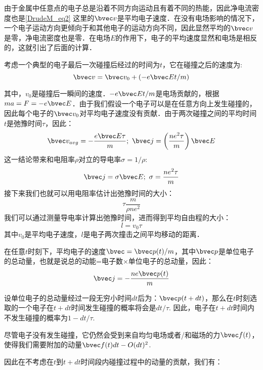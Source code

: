 由于金属中任意点的电子总是沿着不同方向运动且有着不同的热能，因此净电流密度也是\autoref{DrudeM_eq2} 这里的$\bvec v$是平均电子速度．在没有电场影响的情况下，一个电子运动方向更倾向于和其他电子的运动方向不同，因此显然平均的$\bvec v$是零，净电流密度也是零．在电场$E$的作用下，电子的平均速度显然和电场是相反的，这就引出了后面的计算．

考虑一个典型的电子最后一次碰撞后经过的时间为$t$，它在碰撞之后的速度为:
\begin{equation}
\bvec v = \bvec v_0 + (-e\bvec E t/m)
\end{equation}

其中，$v_0$是碰撞后一瞬间的速度．$-e\bvec E t/m$是电场贡献的，根据$ma = F = -e\bvec E$．由于我们假设一个电子可以是在任意方向上发生碰撞的，因此每个电子的$\bvec v_0$对平均电子速度没有贡献．由于两次碰撞之间的平均时间$t$是弛豫时间$\tau$，因此：
\begin{equation}
\bvec v_{avg} = -\frac{e\bvec E \tau}{m}; \ \bvec j =\left(\frac{ne^2\tau}{m}\right)\bvec E
\end{equation}
这一结论带来和电阻率$\rho$对立的导电率$\sigma = 1/\rho$:
\begin{equation}\label{DrudeM_eq4}
\bvec j = \sigma \bvec E; \ \sigma = \frac{ne^2\tau}{m}
\end{equation}
接下来我们也就可以用电阻率估计出弛豫时间的大小：
\begin{equation}
\tau \frac{m}{\rho n e^2}
\end{equation}
我们可以通过测量导电率计算出弛豫时间，进而得到平均自由程的大小：
\begin{equation}
l=v_0\tau
\end{equation}
其中$v_0$是平均电子速度，$l$是电子两次撞击之间平均移动的距离．

在任意$t$时刻下，平均电子的速度$\bvec=\bvec p(t)/m$，其中$\bvec p$是单位电子的总动量，也就是说总的动能=电子数$\times$单位电子的总动量，因此：
\begin{equation}
\bvec j= -\frac{ne\bvec p(t)}{m}
\end{equation}

设单位电子的总动量经过一段无穷小时间$dt$后为：$\bvec p (t+dt)$，那么在$t$时刻选取的一个电子在$t+dt$时间发生碰撞的概率将会是$dt/\tau$. 因此，电子在$t+dt$时间内不发生碰撞的概率为$1-dt/\tau$.

尽管电子没有发生碰撞，它仍然会受到来自均匀电场或者/和磁场的力$\bvec f(t)$，使得我们需要附加的动量$\bvec f(t)dt - O(dt)^2$.

因此在不考虑在$t$到$t+dt$时间段内碰撞过程中的动量的贡献，我们有：

